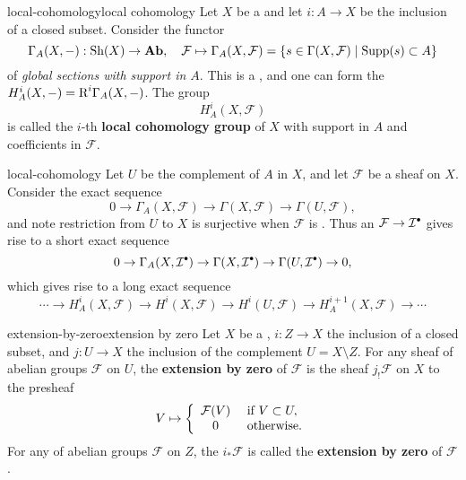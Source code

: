 \begin{topic}{local-cohomology}{local cohomology}
    Let $X$ be a  and let $i : A \to X$ be the inclusion of a closed subset. Consider the functor
    \[ \Gamma_A(X, -) : \textup{Sh}(X) \to \textbf{Ab}, \quad \mathcal{F} \mapsto \Gamma_A(X, \mathcal{F}) = \{ s \in \Gamma(X, \mathcal{F}) \mid \textup{Supp}(s) \subset A \} \]
    of \textit{global sections with support in $A$}. This is a , and one can form the  $H_A^i(X, -) = \textup{R}^i \Gamma_A(X, -)$. The group
    \[ H_A^i(X, \mathcal{F}) \]
    is called the $i$-th \textbf{local cohomology group} of $X$ with support in $A$ and coefficients in $\mathcal{F}$.
\end{topic}

\begin{example}{local-cohomology}
    Let $U$ be the complement of $A$ in $X$, and let $\mathcal{F}$ be a sheaf on $X$. Consider the exact sequence
    \[ 0 \to \Gamma_A(X, \mathcal{F}) \to \Gamma(X, \mathcal{F}) \to \Gamma(U, \mathcal{F}) , \]
    and note restriction from $U$ to $X$ is surjective when $\mathcal{F}$ is . Thus an  $\mathcal{F} \to \mathcal{I}^\bdot$ gives rise to a short exact sequence
    \[ 0 \to \Gamma_A(X, \mathcal{I}^\bdot) \to \Gamma(X, \mathcal{I}^\bdot) \to \Gamma(U, \mathcal{I}^\bdot) \to 0 , \]
    which gives rise to a long exact sequence
    \[ \cdots \to H_A^i(X, \mathcal{F}) \to H^i(X, \mathcal{F}) \to H^i(U, \mathcal{F}) \to H_A^{i + 1}(X, \mathcal{F}) \to \cdots \]
\end{example}

\begin{topic}{extension-by-zero}{extension by zero}
    Let $X$ be a , $i : Z \to X$ the inclusion of a closed subset, and $j : U \to X$ the inclusion of the complement $U = X \setminus Z$. For any sheaf of abelian groups $\mathcal{F}$ on $U$, the \textbf{extension by zero} of $\mathcal{F}$ is the sheaf $j_! \mathcal{F}$ on $X$  to the presheaf
    \[ V \mapsto \left\{ \begin{array}{cl}
        \mathcal{F}(V) & \textup{ if } V \subset U , \\
        0 & \textup{ otherwise} .
    \end{array} \right. \]
    For any  of abelian groups $\mathcal{F}$ on $Z$, the  $i_* \mathcal{F}$ is called the \textbf{extension by zero} of $\mathcal{F}$.
\end{topic}

